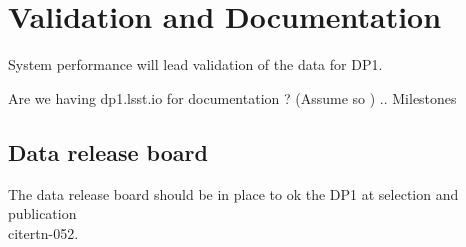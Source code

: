 \section{Validation and Documentation} \label{sec:validation}
System performance will lead validation of the data for DP1.

Are we having dp1.lsst.io  for documentation ? (Assume so ) ..
Milestones

\subsection{Data release board}
The data release board should be in place to ok the DP1 at selection and publication \\cite{rtn-052}.

